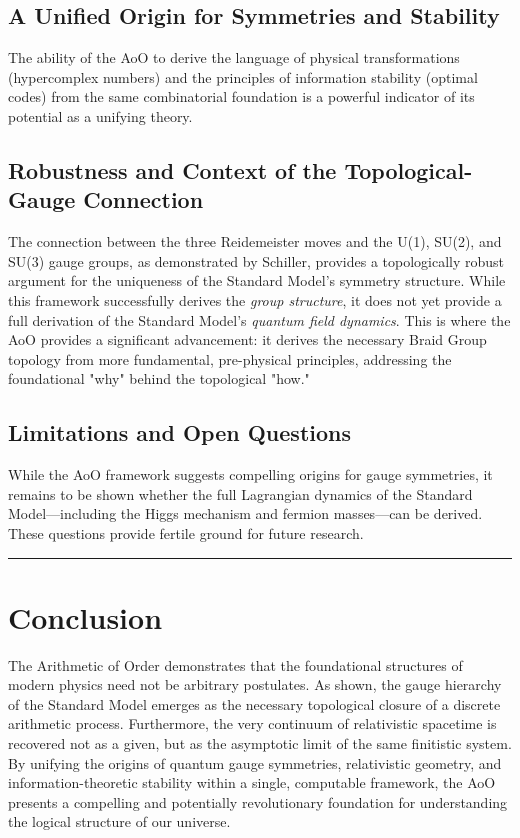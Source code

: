 \documentclass{article}
\theoremstyle{remark}
\begin{document}
\subsection{A Unified Origin for Symmetries and Stability}
The ability of the AoO to derive the language of physical transformations (hypercomplex numbers) and the principles of information stability (optimal codes) from the same combinatorial foundation is a powerful indicator of its potential as a unifying theory.

\subsection{Robustness and Context of the Topological-Gauge Connection}
The connection between the three Reidemeister moves and the U(1), SU(2), and SU(3) gauge groups, as demonstrated by Schiller, provides a topologically robust argument for the uniqueness of the Standard Model's symmetry structure. While this framework successfully derives the \emph{group structure}, it does not yet provide a full derivation of the Standard Model's \emph{quantum field dynamics}. This is where the AoO provides a significant advancement: it derives the necessary Braid Group topology from more fundamental, pre-physical principles, addressing the foundational "why" behind the topological "how."

\subsection{Limitations and Open Questions}
While the AoO framework suggests compelling origins for gauge symmetries, it remains to be shown whether the full Lagrangian dynamics of the Standard Model—including the Higgs mechanism and fermion masses—can be derived. These questions provide fertile ground for future research.

\hrule
\section{Conclusion}
The Arithmetic of Order demonstrates that the foundational structures of modern physics need not be arbitrary postulates. As shown, the gauge hierarchy of the Standard Model emerges as the necessary topological closure of a discrete arithmetic process. Furthermore, the very continuum of relativistic spacetime is recovered not as a given, but as the asymptotic limit of the same finitistic system. By unifying the origins of quantum gauge symmetries, relativistic geometry, and information-theoretic stability within a single, computable framework, the AoO presents a compelling and potentially revolutionary foundation for understanding the logical structure of our universe.
\end{document}
